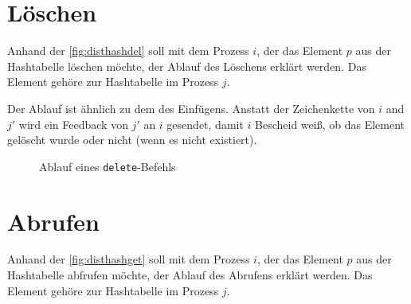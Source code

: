 \documentclass{scrreprt}
\begin{document}
\section{Löschen}
Anhand der \autoref{fig:disthashdel} soll mit dem Prozess $i$, der das Element $p$ aus der Hashtabelle löschen möchte, der Ablauf des Löschens erklärt werden. Das Element gehöre zur Hashtabelle im Prozess $j$.

Der Ablauf ist ähnlich zu dem des Einfügens. Anstatt der Zeichenkette von $i$ and $j'$ wird ein Feedback von $j'$ an $i$ gesendet, damit $i$ Bescheid weiß, ob das Element gelöscht wurde oder nicht (wenn es nicht existiert).

\begin{figure}[!ht]
\centering
{}
\caption{Ablauf eines \lstinline`delete`-Befehls}
\label{fig:disthashdel}
\end{figure}

\section{Abrufen}
Anhand der \autoref{fig:disthashget} soll mit dem Prozess $i$, der das Element $p$ aus der Hashtabelle abfrufen möchte, der Ablauf des Abrufens erklärt werden. Das Element gehöre zur Hashtabelle im Prozess $j$.
\end{document}
